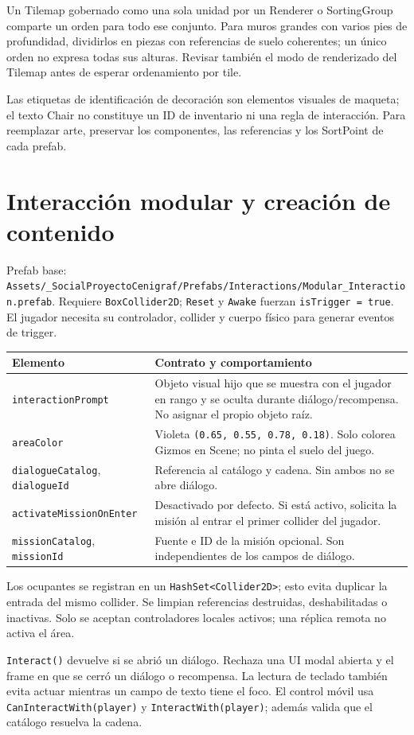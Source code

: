 \documentclass[11pt,letterpaper,oneside]{article}
\makeatletter
\newcommand{\code}[1]{\nolinkurl{#1}}
\newenvironment{spec}{\begingroup\small\begin{longtable}{@{}>{\raggedright\arraybackslash}p{0.32\textwidth}>{\raggedright\arraybackslash}p{0.64\textwidth}@{}}\toprule\textbf{Elemento} & \textbf{Contrato y comportamiento} \\ \midrule\endhead}{\bottomrule\end{longtable}\endgroup}
\makeatother
\begin{document}
Un Tilemap gobernado como una sola unidad por un Renderer o SortingGroup comparte un orden para todo ese conjunto. Para muros grandes con varios pies de profundidad, dividirlos en piezas con referencias de suelo coherentes; un único orden no expresa todas sus alturas. Revisar también el modo de renderizado del Tilemap antes de esperar ordenamiento por tile.

Las etiquetas de identificación de decoración son elementos visuales de maqueta; el texto Chair no constituye un ID de inventario ni una regla de interacción. Para reemplazar arte, preservar los componentes, las referencias y los SortPoint de cada prefab.

\section{Interacción modular y creación de contenido}
Prefab base: \code{Assets/_SocialProyectoCenigraf/Prefabs/Interactions/Modular_Interaction.prefab}. Requiere \code{BoxCollider2D}; \code{Reset} y \code{Awake} fuerzan \code{isTrigger = true}. El jugador necesita su controlador, collider y cuerpo físico para generar eventos de trigger.

\begin{spec}
\code{interactionPrompt} & Objeto visual hijo que se muestra con el jugador en rango y se oculta durante diálogo/recompensa. No asignar el propio objeto raíz. \\
\code{areaColor} & Violeta \code{(0.65, 0.55, 0.78, 0.18)}. Solo colorea Gizmos en Scene; no pinta el suelo del juego. \\
\code{dialogueCatalog}, \code{dialogueId} & Referencia al catálogo y cadena. Sin ambos no se abre diálogo. \\
\code{activateMissionOnEnter} & Desactivado por defecto. Si está activo, solicita la misión al entrar el primer collider del jugador. \\
\code{missionCatalog}, \code{missionId} & Fuente e ID de la misión opcional. Son independientes de los campos de diálogo. \\
\end{spec}
Los ocupantes se registran en un \code{HashSet<Collider2D>}; esto evita duplicar la entrada del mismo collider. Se limpian referencias destruidas, deshabilitadas o inactivas. Solo se aceptan controladores locales activos; una réplica remota no activa el área.

\code{Interact()} devuelve si se abrió un diálogo. Rechaza una UI modal abierta y el frame en que se cerró un diálogo o recompensa. La lectura de teclado también evita actuar mientras un campo de texto tiene el foco. El control móvil usa \code{CanInteractWith(player)} y \code{InteractWith(player)}; además valida que el catálogo resuelva la cadena.
\end{document}
